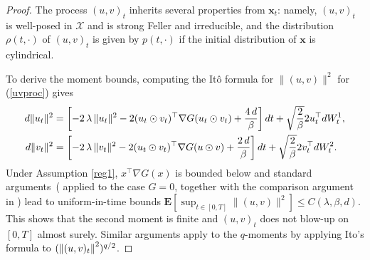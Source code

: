 \documentclass[11pt, twoside]{report}
\renewcommand{\vec}[1]{{\mathbf{#1}}}
\begin{document}
\begin{proof}
The process $(u,v)_t$ inherits several properties from $\vec x_t$:  namely, $(u,v)_t$ is well-posed in $\mathcal X$ and is strong Feller and irreducible, and the distribution $\rho(t,\cdot)$  of $(u,v)_t$ is given by $p(t,\cdot)$ if the initial distribution of $\vec x$ is cylindrical.

To derive the moment bounds, computing the It\^o formula for $\|(u,v)\|^2$ for (\ref{uvproc}) gives 
\begin{align}
d{\|u_t\|^2} 
& = \bp{-2\,\lambda\, {\|u_t\|^2} - 2{(u_t\odot v_t)^\top\nabla G(u_t \odot v_t)\strutb} + \frac{4\,d}{\beta}}\,dt+\sqrt{\frac{2}{\beta}}2u_t^\top dW_t^1, \label{Ito_norm_1_v} \\
d{\|v_t\|^2} & = \bp{-2\,\lambda\, {\|v_t\|^2} - 2{(u_t\odot v_t)^\top\nabla G(u \odot v)\strutb} + \frac{2\,d}{\beta}}\,dt+\sqrt{\frac{2}{\beta}}2v_t^\top dW_t^2.\label{Ito_norm_2_v}
\end{align}
Under Assumption \ref{reg1}, $x^\top \nabla G(x)$ is bounded below and standard arguments~(\cite[Chapter~2, Theorem~4.4]{Mao2008-ur} applied to the case $G=0$, together with the comparison argument in \cite{Ikeda1977-jj}) lead to uniform-in-time bounds $\mathbf{E}[\sup_{t \in [0,T]}\|(u,v)\|^2] \leq C(\lambda,\beta,d)$. This shows that the second moment is finite and $(u,v)_t$ does not blow-up on $[0,T]$ almost surely. Similar arguments apply to the $q$-moments by applying Ito's formula to $(\left\lVert(u,v)_t\right\rVert^2)^{q/2}$.  
\end{proof}
\end{document}
